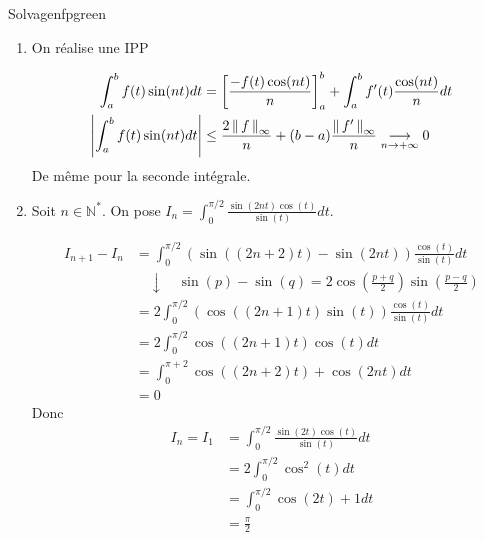     \begin{demo}{Solvage}{nfpgreen}
        \begin{enumerate}
            \item On réalise une \textsc{IPP}
            
            \begin{align*}
                \int_{a}^{b } f(t)\sin(nt)dt 
                &= \left[ \frac{-f(t)\cos(nt)}{n} \right]_a^b + \int_{a }^{b } f'(t)\frac{\cos(nt)}{n} dt \\
                \left\lvert \int_{a}^{b } f(t)\sin(nt)dt\right\rvert 
                &\leq \frac{2 \left\lVert\,f\,\right\rVert_{\infty}}{n} + (b-a) \frac{\left\lVert\,f'\,\right\rVert_{\infty}}{n} \underset{n \rightarrow +\infty}{\longrightarrow} 0
            \end{align*}
            De même pour la seconde intégrale.

            \item Soit $n \in \mathbb{N}^*$. On pose $I_n = \int_{0}^{\pi/2} \frac{\sin(2nt) \cos(t)}{\sin(t)}dt$.
            
            \begin{align*}
                I_{n+1} - I_n 
                &= \int_{0}^{\pi / 2} \left( \sin((2n+2)t) - \sin(2nt) \right) \frac{\cos(t)}{\sin(t)} dt \\
                & \quad \downarrow \quad \sin(p) - \sin(q) = 2 \cos\left(\frac{p + q}{2}\right) \sin\left( \frac{p-q}{2} \right) \\
                &= 2 \int_{0}^{\pi / 2} \left( \cos((2n+1)t) \sin(t) \right) \frac{\cos(t)}{\sin(t)}dt \\
                &= 2 \int_{0}^{\pi / 2} \cos((2n+1)t) \cos(t) dt \\
                &= \int_{0}^{\pi + 2} \cos((2n+2)t) + \cos(2nt) dt \\
                &= 0
            \end{align*}
            Donc
            \begin{align*}
                I_n = I_1 
                &= \int_{0}^{\pi / 2} \frac{\sin(2t) \cos(t)}{\sin(t)}dt \\
                &= 2 \int_{0}^{\pi / 2} \cos^2(t) dt \\
                &= \int_{0}^{\pi / 2} \cos(2t) + 1 dt \\
                &= \frac{\pi}{2}
            \end{align*}


\end{enumerate}
\end{demo}
